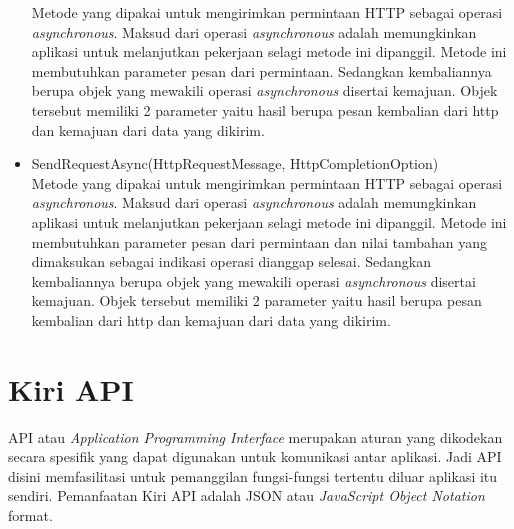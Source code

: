\begin{itemize}
	Metode yang dipakai untuk mengirimkan permintaan HTTP sebagai operasi \textit{asynchronous}. Maksud dari operasi \textit{asynchronous} adalah memungkinkan aplikasi untuk melanjutkan pekerjaan selagi metode ini dipanggil\footnotemark[2]. Metode ini membutuhkan parameter pesan dari permintaan. Sedangkan kembaliannya berupa objek yang mewakili operasi \textit{asynchronous} disertai kemajuan. Objek tersebut memiliki 2 parameter yaitu hasil berupa pesan kembalian dari http dan kemajuan dari data yang dikirim.
	\item SendRequestAsync(HttpRequestMessage, HttpCompletionOption) \\
	Metode yang dipakai untuk mengirimkan permintaan HTTP sebagai operasi \textit{asynchronous}. Maksud dari operasi \textit{asynchronous} adalah memungkinkan aplikasi untuk melanjutkan pekerjaan selagi metode ini dipanggil\footnotemark[2]. Metode ini membutuhkan parameter pesan dari permintaan dan nilai tambahan yang dimaksukan sebagai indikasi operasi dianggap selesai. Sedangkan kembaliannya berupa objek yang mewakili operasi \textit{asynchronous} disertai kemajuan. Objek tersebut memiliki 2 parameter yaitu hasil berupa pesan kembalian dari http dan kemajuan dari data yang dikirim.
\end{itemize}


\section{Kiri API}
\label{sec:Kiri API}
\hspace{0.5cm} API atau \textit{Application Programming Interface} merupakan aturan yang dikodekan secara spesifik yang dapat digunakan untuk komunikasi antar aplikasi. Jadi API disini memfasilitasi untuk pemanggilan fungsi-fungsi tertentu diluar aplikasi itu sendiri. Pemanfaatan Kiri API adalah JSON atau \textit{JavaScript Object Notation} format. 

